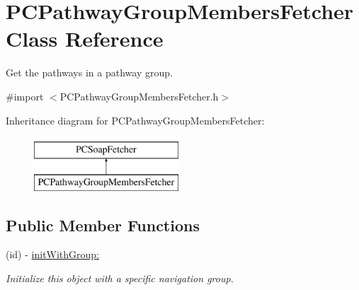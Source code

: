 \hypertarget{interface_p_c_pathway_group_members_fetcher}{
\section{PCPathwayGroupMembersFetcher Class Reference}
\label{interface_p_c_pathway_group_members_fetcher}
}


Get the pathways in a pathway group.  




{\ttfamily \#import $<$PCPathwayGroupMembersFetcher.h$>$}

Inheritance diagram for PCPathwayGroupMembersFetcher:\begin{figure}[h!]
\begin{center}
\leavevmode
\includegraphics[height=2.000000cm]{kegg_doc/interface_p_c_pathway_group_members_fetcher}
\end{center}
\end{figure}
\subsection*{Public Member Functions}
\begin{DoxyCompactItemize}
\item 
\hypertarget{interface_p_c_pathway_group_members_fetcher_a9b3d6f7fa5a41c6df607fbc525f79154}{
(id) -\/ \hyperlink{interface_p_c_pathway_group_members_fetcher_a9b3d6f7fa5a41c6df607fbc525f79154}{initWithGroup:}}
\label{interface_p_c_pathway_group_members_fetcher_a9b3d6f7fa5a41c6df607fbc525f79154}

\begin{DoxyCompactList}\small\item\em Initialize this object with a specific navigation group. \end{DoxyCompactList}\end{DoxyCompactItemize}
